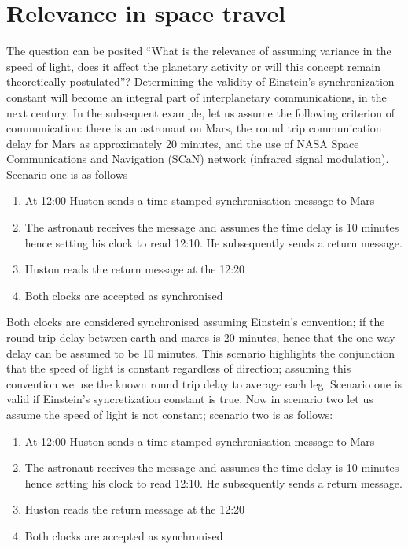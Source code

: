 \documentclass[12pt,letterpaper]{article}
\begin{document}
\section{Relevance in space travel}
The question can be posited “What is the relevance of assuming variance in the speed of light, does it affect the planetary activity or will this concept remain theoretically postulated”? Determining the validity of Einstein's synchronization constant will become an integral part of interplanetary communications, in the next century. In the subsequent example, let us assume the following criterion of communication: there is an astronaut on Mars, the round trip communication delay for Mars as approximately 20 minutes, and the use of NASA Space Communications and Navigation (SCaN) network (infrared signal modulation). Scenario one is as follows
\begin{enumerate}
\item At 12:00 Huston sends a time stamped synchronisation message to Mars
\item The astronaut receives the message and assumes the time delay is 10 minutes hence
setting his clock to read 12:10. He subsequently sends a return message.
\item Huston reads the return message at the 12:20
\item Both clocks are accepted as synchronised
\end{enumerate}
Both clocks are considered synchronised assuming Einstein's convention; if the round trip delay between earth and mares is 20 minutes, hence that the one-way delay can be assumed to be 10 minutes. This scenario highlights the conjunction that the speed of light is constant regardless of direction; assuming this convention we use the known round trip delay to average each leg. Scenario one is valid if Einstein's syncretization constant is true. Now in scenario two let us assume the speed of light is not constant; scenario two is as follows:
\begin{enumerate}
\item At 12:00 Huston sends a time stamped synchronisation message to Mars
\item The astronaut receives the message and assumes the time delay is 10 minutes hence
setting his clock to read 12:10. He subsequently sends a return message.
\item Huston reads the return message at the 12:20
\item Both clocks are accepted as synchronised
\end{enumerate}
\end{document}
